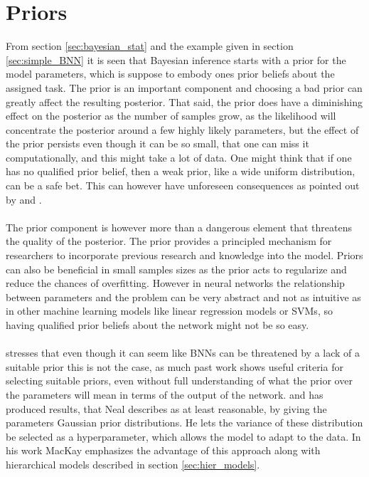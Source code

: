 \section{Priors}\label{sec:priors}
From section \ref{sec:bayesian_stat} and the example given in section \ref{sec:simple_BNN} it is seen that Bayesian inference starts with a prior for the model parameters, which is suppose to embody ones prior beliefs about the assigned task. The prior is an important component and choosing a bad prior can greatly affect the resulting posterior. That said, the prior does have a diminishing effect on the posterior as the number of samples grow, as the likelihood will concentrate the posterior around a few highly likely parameters, but the effect of the prior persists even though it can be so small, that one can miss it computationally, and this might take a lot of data. One might think that if one has no qualified prior belief, then a weak prior, like a wide uniform distribution, can be a safe bet. This can however have unforeseen consequences as pointed out by \cite{lemoine2019} and \cite{sarma_kay2020}. \\
\\
The prior component is however more than a dangerous element that threatens the quality of the posterior. The prior provides a principled mechanism for researchers to incorporate previous research and knowledge into the model. Priors can also be beneficial in small samples sizes as the prior acts to regularize and reduce the chances of overfitting.
However in neural networks the relationship between parameters and the problem can be very abstract and not as intuitive as in other machine learning models like linear regression models or SVMs, so having qualified prior beliefs about the network might not be so easy. \\
\\
\cite{neal2012bayesian} stresses that even though it can seem like BNNs can be threatened by a lack of a suitable prior this is not the case, as much past work shows useful criteria for selecting suitable priors, even without full understanding of what the prior over the parameters will mean in terms of the output of the network. \cite{mackay1991} and \cite{MacKay1992} has produced results, that Neal describes as at least reasonable, by giving the parameters Gaussian prior distributions. He lets the variance of these distribution be selected as a hyperparameter, which allows the model to adapt to the data. In his work MacKay emphasizes the advantage of this approach along with hierarchical models described in section \ref{sec:hier_models}.\\
